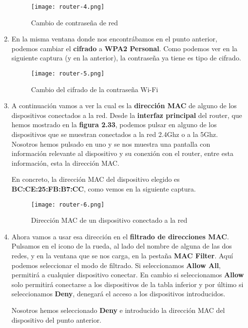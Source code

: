 \begin{enumerate}
    \begin{figure}[H]
        \centering
        \texttt{[image: router-4.png]}
        \caption{Cambio de contraseña de red}
    \end{figure}

    \item En la misma ventana donde nos encontrábamos en el punto anterior, podemos cambiar el \textbf{cifrado} a \textbf{WPA2 Personal}. Como podemos ver en la siguiente captura (y en la anterior), la contraseña ya tiene es tipo de cifrado.

    \begin{figure}[H]
        \centering
        \texttt{[image: router-5.png]}
        \caption{Cambio del cifrado de la contraseña Wi-Fi}
    \end{figure}

    \item A continuación vamos a ver la cual es la \textbf{dirección MAC }de alguno de los dispositivos conectados a la red. Desde la \textbf{interfaz principal} del router, que hemos mostrado en la \textbf{figura 2.33}, podemos pulsar en alguno de los dispositivos que se muestran conectados a la red 2.4Ghz o a la 5Ghz. Nosotros hemos pulsado en uno y se nos muestra una pantalla con información relevante al dispositivo y su conexión con el router, entre esta información, esta la dirección MAC.

    En concreto, la dirección MAC del dispositivo elegido es \textbf{BC:CE:25:FB:B7:CC}, como vemos en la siguiente captura.

    \begin{figure}[H]
        \centering
        \texttt{[image: router-6.png]}
        \caption{Dirección MAC de un dispositivo conectado a la red}
    \end{figure}

    \item Ahora vamos a usar esa dirección en el \textbf{filtrado de direcciones MAC}. Pulsamos en el icono de la rueda, al lado del nombre de alguna de las dos redes, y en la ventana que se nos carga, en la pestaña \textbf{MAC Filter}. Aquí podemos seleccionar el modo de filtrado. Si seleccionamos \textbf{Allow All}, permitirá a cualquier dispositivo conectar. En cambio si seleccionamos \textbf{Allow} solo permitirá conectarse a los dispositivos de la tabla inferior y por último si seleccionamos \textbf{Deny}, denegará el acceso a los dispositivos introducidos.

    Nosotros hemos seleccionado \textbf{Deny} e introducido la dirección MAC del dispositivo del punto anterior.


\end{enumerate}
